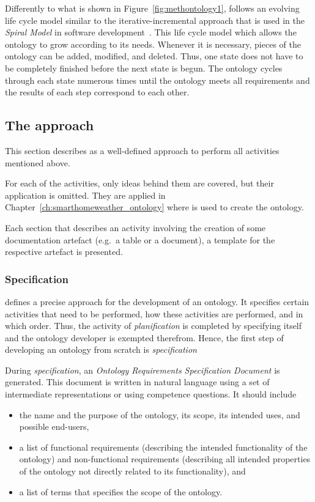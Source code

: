 Differently to what is shown in Figure~\ref{fig:methontology1}, \methontology follows an evolving life cycle model similar to the iterative-incremental approach that is used in the \emph{Spiral Model} in software development~\cite{spiral_model}. This life cycle model which allows the ontology to grow according to its needs. Whenever it is necessary, pieces of the ontology can be added, modified, and deleted. Thus, one state does not have to be completely finished before the next state is begun. The ontology cycles through each state numerous times until the ontology meets all requirements and the results of each step correspond to each other.

\subsection{The \methontology approach}

This section describes \methontology as a well-defined approach to perform all activities mentioned above.

For each of the activities, only ideas behind them are covered, but their application is omitted. They are applied in Chapter~\ref{ch:smarthomeweather_ontology} where \methontology is used to create the \smarthomeweather ontology.

Each section that describes an activity involving the creation of some documentation artefact (e.g.\ a table or a document), a template for the respective artefact is presented.

\subsubsection{Specification}
\label{subsec:methontology_specification}

\methontology defines a precise approach for the development of an ontology. It specifies certain activities that need to be performed, how these activities are performed, and in which order. Thus, the activity of \emph{planification} is completed by specifying \methontology itself and the ontology developer is exempted therefrom. Hence, the first step of developing an ontology from scratch is \emph{specification}

During \emph{specification}, an \emph{Ontology Requirements Specification Document} is generated. This document is written in natural language using a set of intermediate representations or using competence questions. It should include

\begin{itemize}
  \item the name and the purpose of the ontology, its scope, its intended uses, and possible end-users,
  \item a list of functional requirements (describing the intended functionality of the ontology) and non-functional requirements (describing all intended properties of the ontology not directly related to its functionality), and
  \item a list of terms that specifies the scope of the ontology.
\end{itemize}

